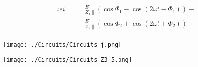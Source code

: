 \documentclass[twocolumn]{article}
\begin{document}
\begin{enumerate}
\begin{align*}
\therefore ei     =&\frac{E^2}{\|Z_1\|}\left(\cos\Phi_1 - \cos\left(2\omega t - \Phi_1\right)\right) -\\
                 &\frac{E^2}{\|Z_2\|}\left(\cos\Phi_2 + \cos\left(2\omega t + \Phi_2\right)\right)\\
\end{align*}
\begin{center}
      \texttt{[image: ./Circuits/Circuits\_j.png]}
    \end{center}
    \begin{center}
      \texttt{[image: ./Circuits/Circuits\_Z3\_5.png]}
    \end{center}
\end{enumerate}
\end{document}
